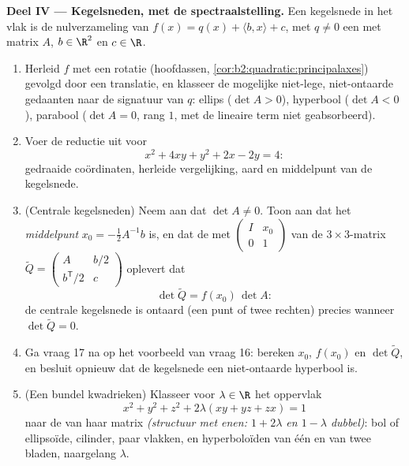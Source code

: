 \begin{problem}
\medskip
\noindent\textbf{Deel IV --- Kegelsneden, met de
spectraalstelling.} Een kegelsnede in het vlak is de
nulverzameling van $f(x) = q(x) + \langle b, x\rangle + c$, met $q
\neq 0$ een  met matrix $A$, $b \in \R^2$ en $c
\in \R$.
\begin{enumerate}[resume]
  \item Herleid $f$ met een rotatie (hoofdassen,
        \cref{cor:b2:quadratic:principalaxes}) gevolgd door een
        translatie, en klasseer de mogelijke niet-lege,
        niet-ontaarde gedaanten naar de signatuur van $q$: ellips
        ($\det A > 0$), hyperbool ($\det A < 0$), parabool ($\det A
        = 0$, rang $1$, met de lineaire term niet geabsorbeerd).
  \item Voer de reductie  uit voor
        \[
        x^2 + 4xy + y^2 + 2x - 2y = 4 :
        \]
        gedraaide coördinaten, herleide vergelijking, aard en
        middelpunt van de kegelsnede.
  \item (Centrale kegelsneden) Neem aan dat $\det A \neq 0$. Toon
        aan dat het \emph{middelpunt} $x_0 = -\frac12 A^{-1}b$ is,
        en dat de  met $\begin{pmatrix} I & x_0\\ 0 &
        1\end{pmatrix}$ van de $3\times3$-matrix $\widetilde Q =
        \begin{pmatrix} A & b/2 \\ b^{\mathsf T}/2 &
        c\end{pmatrix}$ oplevert dat
        \[
        \det\widetilde Q = f(x_0)\,\det A :
        \]
        de centrale kegelsnede is ontaard (een punt of twee
        rechten) precies wanneer $\det\widetilde Q = 0$.
  \item Ga vraag 17 na op het voorbeeld van vraag 16: bereken
        $x_0$, $f(x_0)$ en $\det\widetilde Q$, en besluit opnieuw
        dat de kegelsnede een niet-ontaarde hyperbool is.
  \item (Een bundel kwadrieken) Klasseer voor $\lambda \in \R$ het
        oppervlak
        \[
        x^2 + y^2 + z^2 + 2\lambda(xy + yz + zx) = 1
        \]
        naar de  van haar matrix \emph{(structuur met
        enen:  $1 + 2\lambda$ en $1 - \lambda$
        dubbel)}: bol of ellipsoïde, cilinder, paar vlakken, en
        hyperboloïden van één en van twee bladen, naargelang
        $\lambda$.
\end{enumerate}


\end{problem}
